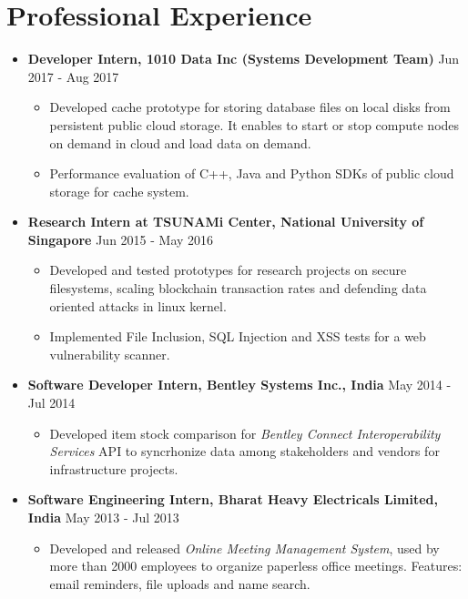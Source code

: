 \documentclass{article}
\newcommand{\bi}{\vspace{-1mm}\begin{itemize}[align=left,leftmargin=*, rightmargin=80pt, labelindent=0pt,labelsep=2pt, label={-}, nosep]}
\newcommand{\ei}{\end{itemize}}
\begin{document}
\section*{Professional Experience}
\begin{itemize}
    \item \textbf{Developer Intern, 1010 Data Inc (Systems Development Team)} {\hfill Jun 2017 - Aug 2017}
    \bi
        \item Developed cache prototype for storing database files on local disks from persistent public cloud storage. It enables to start or stop compute nodes on demand in cloud and load data on demand.
        
        \item Performance evaluation of C++, Java and Python SDKs of public cloud storage for cache system.
    \ei

    \item \textbf{Research Intern at TSUNAMi Center, National University of Singapore} {\hfill Jun 2015 - May 2016}
    \bi
        \item Developed and tested prototypes for research projects on secure filesystems, scaling blockchain transaction rates and defending data oriented attacks in linux kernel.

        \item Implemented File Inclusion, SQL Injection and XSS tests for a web vulnerability scanner.
    \ei
    
    \item \textbf{Software Developer Intern, Bentley Systems Inc., India} {\hfill May 2014 - Jul 2014}
    \bi
        \item Developed item stock comparison for \textit{Bentley Connect Interoperability Services} API to syncrhonize data among stakeholders and vendors for infrastructure projects.
    \ei

    \item \textbf{Software Engineering Intern, Bharat Heavy Electricals Limited, India} {\hfill May 2013 - Jul 2013}
    \bi
        \item Developed and released \textit{Online Meeting Management System}, used by more than 2000 employees to organize paperless office meetings. Features: email reminders, file uploads and name search.
    \ei 
\end{itemize}

\vspace{-2mm}
\end{document}
